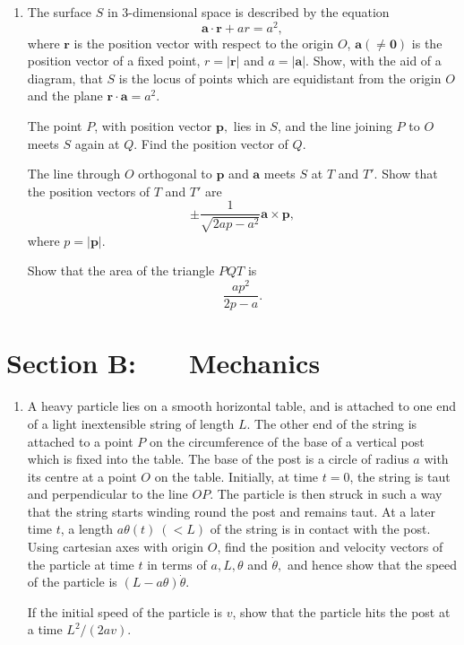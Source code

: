 \documentclass[a4, 11pt]{report}
\newlength{\qspace}
\newcounter{qnumber}
\newenvironment{question}%
 {\vspace{\qspace}
  \begin{enumerate}[\bfseries 1\quad][10]%
    \setcounter{enumi}{\value{qnumber}}%
    \item%
 }
{
  \end{enumerate}
  \filbreak
  \stepcounter{qnumber}
 }
\begin{document}
	
\begin{question}
The surface $S$ in 3-dimensional space is described by the equation
\[
\mathbf{a}\cdot\mathbf{r}+ar=a^{2},
\]
where $\mathbf{r}$ is the position vector with respect to the origin
$O$, $\mathbf{a}(\neq\mathbf{0})$ is the position vector of a fixed
point, $r=\left|\mathbf{r}\right|$ and $a=\left|\mathbf{a}\right|.$
Show, with the aid of a diagram, that $S$ is the locus of points
which are equidistant from the origin $O$ and the plane $\mathbf{r}\cdot\mathbf{a}=a^{2}.$


The point $P$, with position vector $\mathbf{p},$ lies in $S$,
and the line joining $P$ to $O$ meets $S$ again at $Q$. Find the
position vector of $Q$. 


The line through $O$ orthogonal to $\mathbf{p}$ and $\mathbf{a}$
meets $S$ at $T$ and $T'$. Show that the position vectors of $T$
and $T'$ are 
\[
\pm\frac{1}{\sqrt{2ap-a^{2}}}\mathbf{a}\times\mathbf{p},
\]
where $p=\left|\mathbf{p}\right|.$ 


Show that the area of the triangle $PQT$ is 
\[
\frac{ap^{2}}{2p-a}.
\]
			\end{question}
			
		
		
		
	
\newpage
\section*{Section B: \ \ \ Mechanics}


	
\begin{question}
A heavy particle lies on a smooth horizontal table, and is attached
to one end of a light inextensible string of length $L$. The other
end of the string is attached to a point $P$ on the circumference
of the base of a vertical post which is fixed into the table. The
base of the post is a circle of radius $a$ with its centre at a point
$O$ on the table. Initially, at time $t=0$, the string is taut and
perpendicular to the line $OP.$ The particle is then struck in such
a way that the string starts winding round the post and remains taut.
At a later time $t$, a length $a\theta(t)\ (<L)$ of the string is
in contact with the post. Using cartesian axes with origin $O$, find
the position and velocity vectors of the particle at time $t$ in
terms of $a,L,\theta$ and $\dot{\theta},$ and hence show that the
speed of the particle is $(L-a\theta)\dot{\theta}.$ 


If the initial speed of the particle is $v$, show that the particle
hits the post at a time $L^{2}/(2av).$ 

	\end{question}
	
\end{document}
